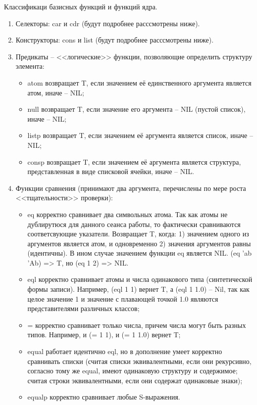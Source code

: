 \documentclass[12pt]{report}
\begin{document}
Классификаци базисных функций и функций ядра.

\begin{enumerate}
	\item Селекторы: car и cdr (будут подробнее расссмотрены ниже).
	\item Конструкторы: cons и list (будут подробнее расссмотрены ниже).
	\item Предикаты -- <<логические>> функции, позволяющие определить структуру элемента:
	\begin{itemize}
		\item atom возвращает T, если значением её единственного аргумента является атом, иначе -- NIL;
		\item null возвращает T, если значение его аргумента -- NIL (пустой список), иначе -- NIL;
		\item listp возвращает T, если значением её аргумента является список, иначе -- NIL;
		\item consp возвращает T, если значением её аргумента является структура, представленная в виде списковой ячейки, иначе -- NIL. 
	\end{itemize}
	\item Функции сравнения (принимают два аргумента, перечислены по мере роста <<тщательности>> проверки):
	\begin{itemize}
		\item eq корректно сравнивает два символьных атома. Так как атомы не дублирутюся для данного сеанса работы, то фактически сравниваются соответсвующие указатели. 
		Возвращает T, когда: 1) значением одного из аргументов является атом, и одновременно 2) значения аргументов равны (идентичны). В ином случае значением функции eq является NIL. (eq  'ab 'Ab) => T, но (eq 1 2) => NIL.
		\item eql корректно сравнивает атомы и числа одинакового типа (синтетической формы записи). Например, (eql 1 1) вернет T, а (eql 1 1.0) -- Nil, так как целое значение 1 и значение с плавающей точкой 1.0 являются представителями различных классов;
		\item = корректно сравнивает только числа, причем числа могут быть разных типов. Например, и (= 1 1), и (= 1 1.0) вернет T;
		\item equal работает идентично eql, но в дополнение умеет корректно сравнивать списки (считая списки эквивалентными, если они рекурсивно, согласно тому же equal, имеют одинаковую структуру и содержимое; считая строки эквивалентными, если они содержат одинаковые знаки);
		\item equalp корректно сравнивает любые S-выражения. 
	\end{itemize}
\end{enumerate}
	
\end{document}
